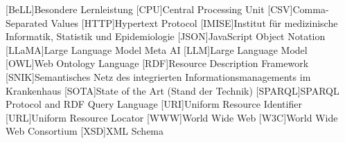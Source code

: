 \begin{acronym}[SPARQL]
[BeLL]{Besondere Lernleistung}
[CPU]{Central Processing Unit}
[CSV]{Comma-Separated Values}
[HTTP]{Hypertext Protocol}
[IMISE]{Institut für medizinische Informatik, Statistik und Epidemiologie}
[JSON]{JavaScript Object Notation}
[LLaMA]{Large Language Model Meta AI}
[LLM]{Large Language Model}
[OWL]{Web Ontology Language}
[RDF]{Resource Description Framework}
[SNIK]{Semantisches Netz des integrierten Informationsmanagements im Krankenhaus}
[SOTA]{State of the Art (Stand der Technik)}
[SPARQL]{SPARQL Protocol and RDF Query Language}
[URI]{Uniform Resource Identifier}
[URL]{Uniform Resource Locator}
[WWW]{World Wide Web}
[W3C]{World Wide Web Consortium}
[XSD]{XML Schema}
\end{acronym}
